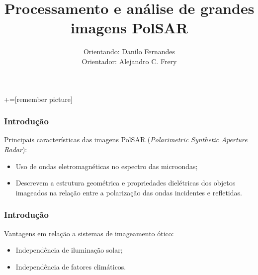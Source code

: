 \documentclass[10pt]{beamer}
\title{Processamento e análise de grandes imagens PolSAR}
\date{}
\author{Orientando: Danilo Fernandes\\ Orientador: Alejandro C. Frery}
\begin{document}
+=[remember picture]

\everymath{\displaystyle}

\begin{frame}
    \titlepage
\end{frame}

\begin{frame}
\frametitle{Introdução}

Principais características das imagens PolSAR (\textit{Polarimetric Synthetic Aperture Radar}):
\begin{itemize}
    \item Uso de ondas eletromagnéticas no espectro das microondas;%
    \item Descrevem a estrutura geométrica e propriedades dielétricas dos objetos imageados na relação entre a polarização das ondas incidentes e refletidas.
\end{itemize}

\end{frame}

\begin{frame}
\frametitle{Introdução}

Vantagens em relação a sistemas de imageamento ótico:

\begin{itemize}
    \item Independência de iluminação solar;
    \item Independência de fatores climáticos.
\end{itemize}

\end{frame}
\end{document}

